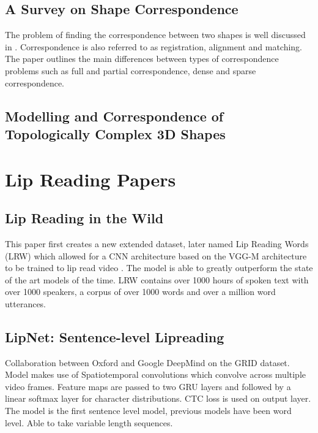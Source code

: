 \documentclass[12pt]{article}
\begin{document}
\subsection{A Survey on Shape Correspondence}
The problem of finding the correspondence between two shapes is well discussed in \cite{Kaick2011}.
Correspondence is also referred to as registration, alignment and matching.
The paper outlines the main differences between types of correspondence problems such as full and partial correspondence, dense and sparse correspondence.

\subsection{Modelling and Correspondence of Topologically Complex 3D Shapes}
\cite{Alhashim2015}


\section{Lip Reading Papers}
\subsection{Lip Reading in the Wild}
This paper first creates a new extended dataset, later named Lip Reading Words (LRW) which allowed for a CNN architecture based on the VGG-M architecture to be trained to lip read video \cite{Chung2016}.
The model is able to greatly outperform the state of the art models of the time.
LRW contains over 1000 hours of spoken text with over 1000 speakers, a corpus of over 1000 words and over a million word utterances.

\subsection{LipNet: Sentence-level Lipreading}
Collaboration between Oxford and Google DeepMind \cite{Assael2016} on the GRID dataset.
Model makes use of Spatiotemporal convolutions which convolve across multiple video frames.
Feature maps are passed to two GRU layers and followed by a linear softmax layer for character distributions.
CTC loss is used on output layer.
The model is the first sentence level model, previous models have been word level.
Able to take variable length sequences.
\end{document}
